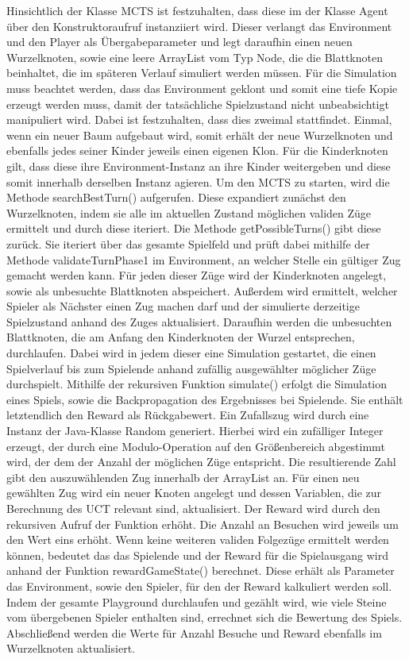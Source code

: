 \documentclass[12pt,a4paper]{article}
\begin{document}
Hinsichtlich der Klasse MCTS ist festzuhalten, dass diese im der Klasse Agent über den Konstruktoraufruf instanziiert wird. Dieser verlangt das Environment und den Player als Übergabeparameter und legt daraufhin einen neuen Wurzelknoten, sowie eine leere ArrayList vom Typ Node, die die Blattknoten beinhaltet, die im späteren Verlauf simuliert werden müssen. Für die Simulation muss beachtet werden, dass das Environment geklont und somit eine tiefe Kopie erzeugt werden muss, damit der tatsächliche Spielzustand nicht unbeabsichtigt manipuliert wird. Dabei ist festzuhalten, dass dies zweimal stattfindet. Einmal, wenn ein neuer Baum aufgebaut wird, somit erhält der neue Wurzelknoten und ebenfalls jedes seiner Kinder jeweils einen eigenen Klon. Für die Kinderknoten gilt, dass diese ihre Environment-Instanz an ihre Kinder weitergeben und diese somit innerhalb derselben Instanz agieren. Um den MCTS zu starten, wird die Methode searchBestTurn() aufgerufen. Diese expandiert zunächst den Wurzelknoten, indem sie alle im aktuellen Zustand möglichen validen Züge ermittelt und durch diese iteriert. Die Methode getPossibleTurns() gibt diese zurück. Sie iteriert über das gesamte Spielfeld und prüft dabei mithilfe der Methode validateTurnPhase1 im Environment, an welcher Stelle ein gültiger Zug gemacht werden kann. Für jeden dieser Züge wird der Kinderknoten angelegt, sowie als unbesuchte Blattknoten abspeichert. Außerdem wird ermittelt, welcher Spieler als Nächster einen Zug machen darf und der simulierte derzeitige Spielzustand anhand des Zuges aktualisiert. Daraufhin werden die unbesuchten Blattknoten, die am Anfang den Kinderknoten der Wurzel entsprechen, durchlaufen. Dabei wird in jedem dieser eine Simulation gestartet, die einen Spielverlauf bis zum Spielende anhand zufällig ausgewählter möglicher Züge durchspielt. Mithilfe der rekursiven Funktion simulate() erfolgt die Simulation eines Spiels, sowie die Backpropagation des Ergebnisses bei Spielende. Sie enthält letztendlich den Reward als Rückgabewert. Ein Zufallszug wird durch eine Instanz der Java-Klasse Random generiert. Hierbei wird ein zufälliger Integer erzeugt, der durch eine Modulo-Operation auf den Größenbereich abgestimmt wird, der dem der Anzahl der möglichen Züge entspricht. Die resultierende Zahl gibt den auszuwählenden Zug innerhalb der ArrayList an. Für einen neu gewählten Zug wird ein neuer Knoten angelegt und dessen Variablen, die zur Berechnung des UCT relevant sind, aktualisiert. Der Reward wird durch den rekursiven Aufruf der Funktion erhöht. Die Anzahl an Besuchen wird jeweils um den Wert eins erhöht. Wenn keine weiteren validen Folgezüge ermittelt werden können, bedeutet das das Spielende und der Reward für die Spielausgang wird anhand der Funktion rewardGameState() berechnet. Diese erhält als Parameter das Environment, sowie den Spieler, für den der Reward kalkuliert werden soll. Indem der gesamte Playground durchlaufen und gezählt wird, wie viele Steine vom übergebenen Spieler enthalten sind, errechnet sich die Bewertung des Spiels. Abschließend werden die Werte für Anzahl Besuche und Reward ebenfalls im Wurzelknoten aktualisiert.
\end{document}
